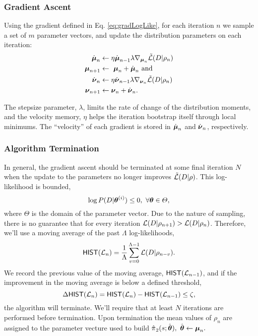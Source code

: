 \subsubsection{Gradient Ascent}

    Using the gradient defined in Eq. \ref{eq:gradLogLike}, for each iteration $n$ we sample a set of $m$ parameter
    vectors, and update the distribution parameters on each iteration:
    \begin{equation}\label{eq:gradient_update}
        \begin{aligned}
            \dot{\boldsymbol{\mathbb{\mu}}}_n & \leftarrow \eta\dot{\boldsymbol{\mathbb{\mu}}}_{n-1} \lambda\nabla_{\boldsymbol{\mathbb{\mu}}_n}
                                    \tilde{\mathcal{L}}(D|\rho_n)\\
            \boldsymbol{\mathbb{\mu}}_{n+1} & \leftarrow\ \boldsymbol{\mathbb{\mu}}_n + \dot{\boldsymbol{\mathbb{\mu}}}_n\ \text{and}\\
            \dot{\boldsymbol{\mathbb{\nu}}}_n & \leftarrow \eta\dot{\boldsymbol{\mathbb{\nu}}}_{n-1} \lambda\nabla_{\boldsymbol{\mathbb{\nu}}_n}
                                    \tilde{\mathcal{L}}(D|\rho_n)\\
            \boldsymbol{\mathbb{\nu}}_{n+1} & \leftarrow \boldsymbol{\mathbb{\nu}}_n + \dot{\boldsymbol{\mathbb{\nu}}}_n.
        \end{aligned}
    \end{equation}

    \noindent
    The stepsize parameter, $\lambda$, limits the rate of change of the distribution moments, and the velocity memory,
    $\eta$ helps the iteration bootstrap itself through local minimums. The ``velocity'' of each gradient is stored in
    $\dot{\boldsymbol{\mathbb{\mu}}}_n$ and $\dot{\boldsymbol{\mathbb{\nu}}}_n$, respectively.

\subsubsection{Algorithm Termination}\label{sec:policy_infer_terminate}

    In general, the gradient ascent should be terminated at some final iteration $N$ when the update to the parameters
    no longer improves
    $\tilde{\mathcal{L}}(D|\rho)$. This log-likelihood is bounded,
    \[
    \log P(D|\boldsymbol{\mathbb{\theta}}^{(i)}) \leq 0,\  \forall \boldsymbol{\mathbb{\theta}} \in \varTheta,
    \]
    where $\varTheta$ is the domain of the parameter vector. Due to the nature of sampling, there is no guarantee that
    for every iteration $\mathcal{L}(D|\rho_{n+1})> \mathcal{L}(D|\rho_n)$. Therefore, we'll use a moving average of the past
    $\Lambda$ log-likelihoods,
    \[
    \mathsf{HIST}(\mathcal{L}_n)=\frac{1}{\Lambda}\sum_{v=0}^{\Lambda-1}\mathcal{L}(D|\rho_{n-v}).
    \]
    We record the previous value of the moving average, $\mathsf{HIST}(\mathcal{L}_{n-1})$, and if the improvement in the
    moving average is below a defined threshold,
    \[
    \Delta\mathsf{HIST}(\mathcal{L}_n) = \mathsf{HIST}(\mathcal{L}_n) - \mathsf{HIST}(\mathcal{L}_{n-1}) \leq \zeta,
    \]
    the algorithm will terminate. We'll require that at least $N$ iterations are performed before termination. Upon
    termination the mean values of $\rho_{n}$ are assigned to the parameter vecture used to build
    $\estimate{\policy{}}_{2}(s;\estimate{\paramVec}),\ \estimate{\paramVec} \leftarrow \vect{\mu}_n.$

